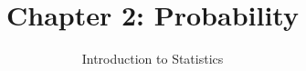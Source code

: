 \documentclass[slidestop,compress,mathserif]{beamer}
\title[Chp 2: Probability]{Chapter 2: Probability}
\author{Introduction to Statistics}
\date{}
\institute{}
\begin{document}


\begin{frame}[plain]

\titlepage

\end{frame}








\end{document}
